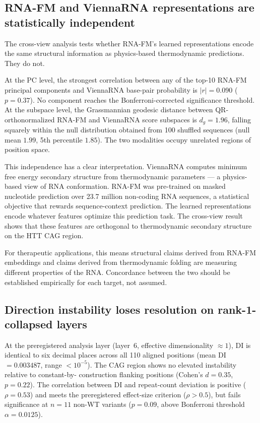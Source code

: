 \documentclass[11pt]{article}
\begin{document}
\subsection{RNA-FM and ViennaRNA representations are statistically independent}

The cross-view analysis tests whether RNA-FM's learned representations
encode the same structural information as physics-based thermodynamic
predictions. They do not.

At the PC level, the strongest correlation between any of the top-10
RNA-FM principal components and ViennaRNA base-pair probability is
$|r| = 0.090$ ($p = 0.37$). No component reaches the
Bonferroni-corrected significance threshold. At the subspace level, the
Grassmannian geodesic distance between QR-orthonormalized RNA-FM and
ViennaRNA score subspaces is $d_g = 1.96$, falling squarely within the
null distribution obtained from 100 shuffled sequences (null mean
$1.99$, 5th percentile $1.85$). The two modalities occupy unrelated
regions of position space.

This independence has a clear interpretation. ViennaRNA computes
minimum free energy secondary structure from thermodynamic parameters
--- a physics-based view of RNA conformation. RNA-FM was pre-trained on
masked nucleotide prediction over 23.7 million non-coding RNA
sequences, a statistical objective that rewards sequence-context
prediction. The learned representations encode whatever features
optimize this prediction task. The cross-view result shows that these
features are orthogonal to thermodynamic secondary structure on the HTT
CAG region.

For therapeutic applications, this means structural claims derived from
RNA-FM embeddings and claims derived from thermodynamic folding are
measuring different properties of the RNA. Concordance between the two
should be established empirically for each target, not assumed.

\subsection{Direction instability loses resolution on rank-1-collapsed layers}

At the preregistered analysis layer (layer~6, effective dimensionality
$\approx 1$), DI is identical to six decimal places across all 110
aligned positions (mean DI $= 0.003487$, range $< 10^{-5}$). The
CAG region shows no elevated instability relative to constant-by-
construction flanking positions (Cohen's $d = 0.35$, $p = 0.22$). The
correlation between DI and repeat-count deviation is positive
($\rho = 0.53$) and meets the preregistered effect-size criterion
($\rho > 0.5$), but fails significance at $n = 11$ non-WT variants
($p = 0.09$, above Bonferroni threshold $\alpha = 0.0125$).
\end{document}
